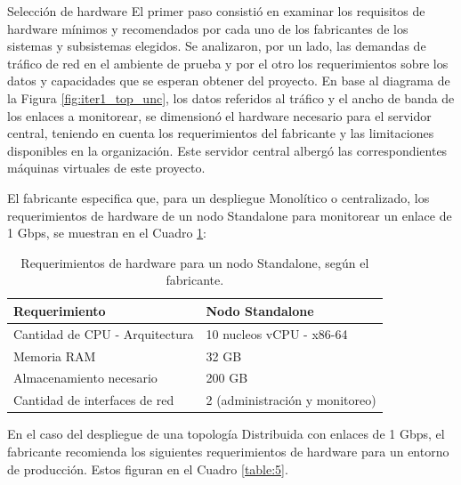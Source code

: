         \begin{subsection}{Selección de hardware}
        \label{seleccion_hw}
        El primer paso consistió en examinar los requisitos de hardware mínimos y recomendados por cada uno de los fabricantes de los sistemas y subsistemas elegidos. Se analizaron, por un lado, las demandas de tráfico de red en el ambiente de prueba y por el otro los requerimientos sobre los datos y capacidades que se esperan obtener del proyecto. En base al diagrama de la Figura \ref{fig:iter1_top_unc}, los datos referidos al tráfico y el ancho de banda de los enlaces a monitorear, se dimensionó el hardware necesario para el servidor central, teniendo en cuenta los requerimientos del fabricante y las limitaciones disponibles en la organización. Este servidor central albergó las correspondientes máquinas virtuales de este proyecto.\par
        El fabricante especifica que, para un despliegue Monolítico o centralizado, los requerimientos de hardware de un nodo Standalone para monitorear un enlace de 1 Gbps, se muestran en el Cuadro \ref{table:15}:
        \begin{table}[H]
        \centering
        \begin{tabular}{|m{10em}|m{10em}|}
        \hline 
            Requerimiento  & Nodo Standalone \\ 
            \hline
            Cantidad de CPU - Arquitectura &  10 nucleos vCPU - x86-64  \\ 
            \hline
            Memoria RAM  &  32 GB  \\ 
            \hline
            Almacenamiento necesario   & 200 GB  \\
            \hline
            Cantidad de interfaces de red  & 2 (administración y monitoreo) \\
            \hline %
            \end{tabular}
            \caption{Requerimientos de hardware para un nodo Standalone, según el fabricante.}
            \label{table:15}
        \end{table}
        En el caso del despliegue de una topología Distribuida con enlaces de 1 Gbps, el fabricante recomienda los siguientes requerimientos de hardware para un entorno de producción. Estos figuran en el Cuadro \ref{table:5}.  
        \begin{table}[H]
            \centering
            \begin{tabular}{|m{9em}|m{9em}|m{9em}|m{9em}|}
            

\end{tabular}
\end{table}
\end{subsection}

